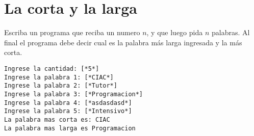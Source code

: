 
\section{La corta y la larga}

Escriba un programa que reciba un numero $n$, y que luego pida $n$ palabras. Al final el programa debe decir cual es la palabra más larga ingresada y la más corta.

\begin{lstlisting}[style=consola]
Ingrese la cantidad: [*5*]
Ingrese la palabra 1: [*CIAC*]
Ingrese la palabra 2: [*Tutor*]
Ingrese la palabra 3: [*Programacion*]
Ingrese la palabra 4: [*asdasdasd*]
Ingrese la palabra 5: [*Intensivo*]
La palabra mas corta es: CIAC
La palabra mas larga es Programacion
\end{lstlisting}
